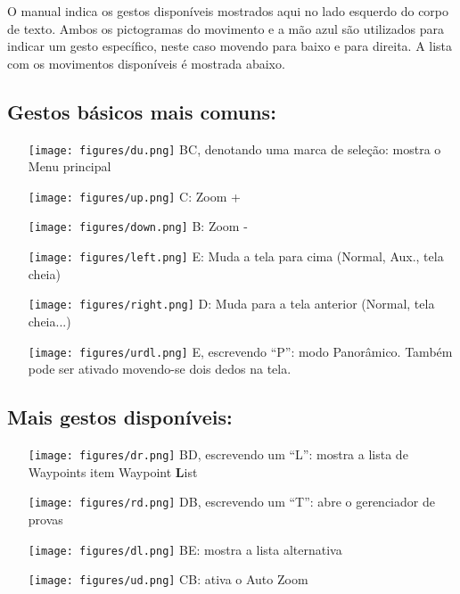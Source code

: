 O manual indica os gestos disponíveis mostrados aqui no lado esquerdo do corpo de texto.  Ambos os pictogramas do movimento e a mão azul são utilizados para indicar um gesto específico, neste caso movendo para baixo e para direita.  A lista com os movimentos disponíveis é mostrada abaixo. 
\vspace{2em}

\subsection*{Gestos básicos mais comuns:}
\begin{itemize}
\item[\raisebox{-1em}
{\texttt{[image: figures/du.png]}}] BC, denotando uma marca de seleção: mostra o Menu principal
\item[\raisebox{-1em}
{\texttt{[image: figures/up.png]}}] C: Zoom +
\item[\raisebox{-1em}
{\texttt{[image: figures/down.png]}}] B: Zoom -
\item[\raisebox{-1em}
{\texttt{[image: figures/left.png]}}] E: Muda a tela para cima (Normal, Aux., tela cheia)
\item[\raisebox{-1em}
{\texttt{[image: figures/right.png]}}] D: Muda para a tela anterior (Normal, tela cheia...)
\item[\raisebox{-1em}
{\texttt{[image: figures/urdl.png]}}] E, escrevendo “P”: modo Panorâmico.  Também pode ser ativado movendo-se dois dedos na tela.
\end{itemize}
\vspace{2em}

\subsection*{Mais gestos disponíveis:}
\begin{itemize}
\item[\raisebox{-1em}
{\texttt{[image: figures/dr.png]}}] BD, escrevendo um “L”: mostra a lista de Waypoints 
item Waypoint \textbf{L}ist
\item[\raisebox{-1em}
{\texttt{[image: figures/rd.png]}}] DB, escrevendo um “T”: abre o gerenciador de provas
\item[\raisebox{-1em}
{\texttt{[image: figures/dl.png]}}] BE: mostra a lista alternativa
\item[\raisebox{-1em}
{\texttt{[image: figures/ud.png]}}]CB: ativa o Auto Zoom
\end{itemize}
\vspace{2em}

